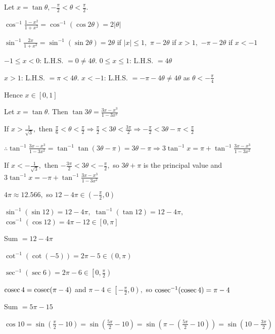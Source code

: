 \item Let $x = \tan\theta, -\frac{\pi}{2} < \theta < \frac{\pi}{2}.$

  $\cos^{-1}\frac{1 - x^2}{1 + x^2} = \cos^{-1}(\cos2\theta) = 2|\theta|$

  $\sin^{-1}\frac{2x}{1 + x^2} = \sin^{-1}(\sin2\theta) = 2\theta$ if $|x|\leq 1,$ $\pi - 2\theta$ if $x > 1,$ $-\pi - 2\theta$ if
  $x < -1$

  $-1\leq x < 0$: L.H.S. $= 0 \neq 4\theta.$ $0\leq x\leq 1$: L.H.S. $= 4\theta$

  $x > 1$: L.H.S. $= \pi < 4\theta.$ $x < -1$: L.H.S. $= -\pi - 4\theta \neq 4\theta$ as $\theta < -\frac{\pi}{4}$

  Hence $x\in[0, 1]$

\item Let $x = \tan\theta.$ Then $\tan3\theta = \frac{3x - x^3}{1 - 3x^2}$

  If $x > \frac{1}{\sqrt{3}},$ then $\frac{\pi}{6} < \theta < \frac{\pi}{2} \Rightarrow \frac{\pi}{2} < 3\theta <
  \frac{3\pi}{2} \Rightarrow -\frac{\pi}{2} < 3\theta - \pi < \frac{\pi}{2}$

  $\therefore \tan^{-1}\frac{3x - x^3}{1 - 3x^2} = \tan^{-1}\tan(3\theta - \pi) = 3\theta - \pi \Rightarrow 3\tan^{-1}x = \pi +
  \tan^{-1}\frac{3x - x^3}{1 - 3x^2}$

  If $x < -\frac{1}{\sqrt{3}},$ then $-\frac{3\pi}{2} < 3\theta < -\frac{\pi}{2},$ so $3\theta + \pi$ is the principal value and
  $3\tan^{-1}x = -\pi + \tan^{-1}\frac{3x - x^3}{1 - 3x^2}$

\item $4\pi\approx 12.566,$ so $12 - 4\pi\in\left(-\frac{\pi}{2}, 0\right)$

  $\sin^{-1}(\sin12) = 12 - 4\pi,$ $\tan^{-1}(\tan12) = 12 - 4\pi,$ $\cos^{-1}(\cos12) = 4\pi - 12\in[0, \pi]$

  Sum $= 12 - 4\pi$

\item $\cot^{-1}(\cot(-5)) = 2\pi - 5\in(0, \pi)$

  $\sec^{-1}(\sec6) = 2\pi - 6\in\left[0, \frac{\pi}{2}\right)$

  ${\rm cosec}\,4 = {\rm cosec}(\pi - 4)$ and $\pi - 4\in\left[-\frac{\pi}{2}, 0\right),$ so ${\rm cosec}^{-1}({\rm
  cosec}\,4) = \pi - 4$

  Sum $= 5\pi - 15$

\item $\cos10 = \sin\left(\frac{\pi}{2} - 10\right) = \sin\left(\frac{5\pi}{2} - 10\right) = \sin\left(\pi - \left(\frac{5\pi}{2} -
  10\right)\right) = \sin\left(10 - \frac{3\pi}{2}\right)$

